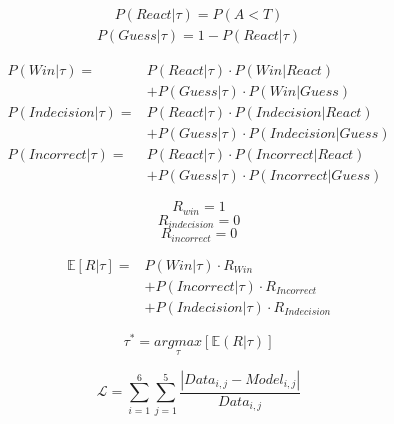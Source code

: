 \documentclass[12pt,letterpaper]{article}
\begin{document}
\begin{align}
    P(React|\tau) = P(A<T)
\end{align}
\begin{align}
    P(Guess|\tau) = 1 - P(React|\tau)
\end{align}


\begin{align}
    P(Win|\tau)        = & P(React|\tau) \cdot P(Win|React) \nonumber        \\ &+  P(Guess|\tau) \cdot P(Win|Guess)\\
    P(Indecision|\tau) = & P(React|\tau) \cdot P(Indecision|React) \nonumber \\ &+ P(Guess|\tau) \cdot P(Indecision|Guess) \\
    P(Incorrect|\tau)  = & P(React|\tau) \cdot P(Incorrect|React) \nonumber  \\ &+ P(Guess|\tau) \cdot P(Incorrect|Guess)
\end{align}


\begin{equation}
    R_{win} = 1
\end{equation}
\begin{equation}
    R_{indecision} = 0
\end{equation}
\begin{equation}
    R_{incorrect} = 0
\end{equation}

\begin{align}
    \mathbb{E}[R|\tau] = & P(Win|\tau) \cdot R_{Win} \nonumber \\ &+ P(Incorrect|\tau) \cdot R_{Incorrect} \nonumber \\ &+ P(Indecision|\tau) \cdot R_{Indecision}
\end{align}

\begin{equation}
    \tau^* = \underset{\tau}{argmax}[\mathbb{E}(R|\tau)]
\end{equation}




\begin{equation}
    \mathcal{L} = \sum_{i = 1}^{6} \sum_{j = 1}^{5} \frac{|Data_{i,j} - Model_{i,j}|}{Data_{i,j}}
\end{equation}
\end{document}
